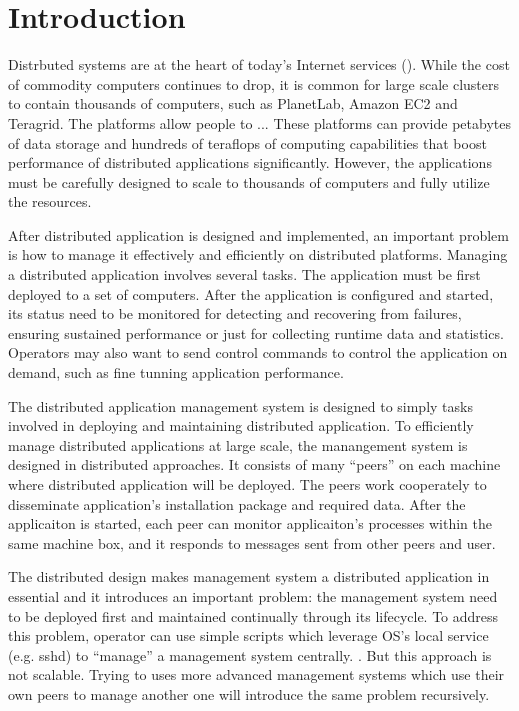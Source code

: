 \section{Introduction}


Distrbuted systems are at the heart of today's Internet
services (). While the cost of commodity
computers continues to drop, it is common for large scale
clusters to contain thousands of computers, such as
PlanetLab, Amazon EC2 and Teragrid. The platforms allow
people to ... These platforms can
provide petabytes of data storage and hundreds of teraflops
of computing capabilities that boost performance of
distributed applications significantly. However, the
applications must be carefully designed to scale to
thousands of computers and fully utilize the resources.

After distributed application is designed and implemented,
an important problem is how to manage it effectively and
efficiently on distributed platforms. Managing a distributed
application involves several tasks. The application must be
first deployed to a set of computers. After the application
is configured and started, its status need to be monitored
for detecting and recovering from failures, ensuring
sustained performance or just for collecting runtime data
and statistics. Operators may also want to send control
commands to control the application on demand, such as fine
tunning application performance.

The distributed application management system is designed to
simply tasks involved in deploying and maintaining
distributed application. To efficiently manage distributed
applications at large scale, the manangement system is
designed in distributed approaches. It consists of many
``peers''  on each
machine where distributed application will be deployed. The
peers work cooperately to disseminate application's
installation package and required data. After the
applicaiton is started, each peer can monitor applicaiton's
processes within the same machine box, and it responds to
messages sent from other peers and user.

The distributed design makes management system a distributed
application in essential and it introduces an important
problem: the management system need to be deployed first and
maintained continually through its lifecycle. To address
this problem, operator can use simple scripts which leverage
OS's local service (e.g. sshd) to ``manage'' a management
system centrally. . But this
approach is not scalable. Trying to uses more advanced
management systems which use their own peers to manage
another one will introduce the same problem recursively.

